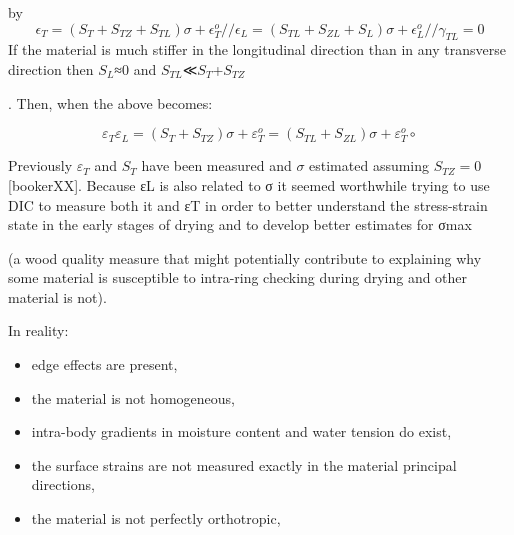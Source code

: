 by
\begin {equation}
\epsilon_T=(S_T+S_{TZ}+S_{TL})σ+\epsilon^o_T//
\epsilon_L=(S_{TL}+S_{ZL}+S_L)σ+\epsilon^o_L//
\gamma_{TL}=0
\end{equation}
If the material is much stiffer in the longitudinal direction than in any transverse direction then $S_L$≈0
and $S_{TL}$≪$S_T$+$S_{TZ}$

. Then, when the above becomes:

$$\varepsilon_T \varepsilon_L = (S_T+S_{TZ})\sigma + \varepsilon^o_T = \left(S_{TL}+S_{ZL}\right) \sigma + \varepsilon^o_T∘$$

Previously $\varepsilon_T$ and $S_T$ have been measured and $\sigma$ estimated assuming $S_{TZ}=0$ [bookerXX]. Because εL is also related to σ it seemed worthwhile trying to use DIC to measure both it and εT in order to better understand the stress-strain state in the early stages of drying and to develop better estimates for σmax

(a wood quality measure that might potentially contribute to explaining why some material is susceptible to intra-ring checking during drying and other material is not).

In reality:

   \begin{itemize}
\item  edge effects are present,
\end{itemize}
\begin{itemize}
\item     the material is not homogeneous,
\end{itemize}
\begin{itemize}
\item     intra-body gradients in moisture content and water tension do exist,
\end{itemize}
\begin{itemize}
\item     the surface strains are not measured exactly in the material principal directions,
\end{itemize}
\begin{itemize}
\item     the material is not perfectly orthotropic,
\end{itemize}